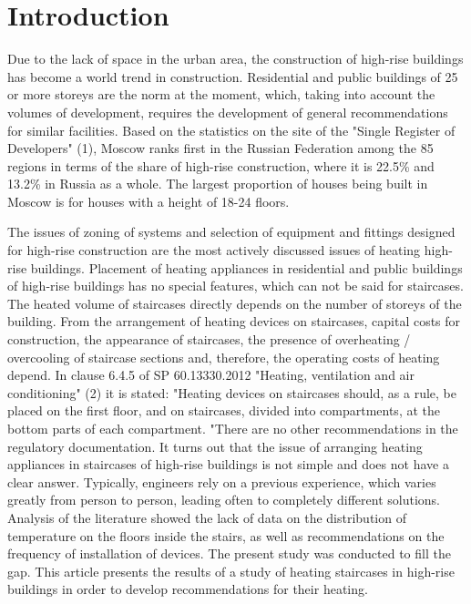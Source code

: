 \documentclass[preprint,12pt]{elsarticle}
\begin{document}


\section{Introduction}


Due to the lack of space in the urban area, the construction of high-rise buildings has become a world trend in construction. Residential and public buildings of 25 or more storeys are the norm at the moment, which, taking into account the volumes of development, requires the development of general recommendations for similar facilities. Based on the statistics on the site of the "Single Register of Developers" (1), Moscow ranks first in the Russian Federation among the 85 regions in terms of the share of high-rise construction, where it is 22.5\% and 13.2\% in Russia as a whole. The largest proportion of houses being built in Moscow is for houses with a height of 18-24 floors.

The issues of zoning of systems and selection of equipment and fittings designed for high-rise construction are the most actively discussed issues of heating high-rise buildings. Placement of heating appliances in residential and public buildings of high-rise buildings has no special features, which can not be said for staircases. The heated volume of staircases directly depends on the number of storeys of the building. From the arrangement of heating devices on staircases, capital costs for construction, the appearance of staircases, the presence of overheating / overcooling of staircase sections and, therefore, the operating costs of heating depend.
In clause 6.4.5 of SP 60.13330.2012 "Heating, ventilation and air conditioning" (2) it is stated: "Heating devices on staircases should, as a rule, be placed on the first floor, and on staircases, divided into compartments, at the bottom parts of each compartment. "There are no other recommendations in the regulatory documentation.
It turns out that the issue of arranging heating appliances in staircases of high-rise buildings is not simple and does not have a clear answer. Typically, engineers rely on a previous experience, which varies greatly from person to person, leading often to completely different solutions.
Analysis of the literature showed the lack of data on the distribution of temperature on the floors inside the stairs, as well as recommendations on the frequency of installation of devices. The present study was conducted to fill the gap. This article presents the results of a study of heating staircases in high-rise buildings in order to develop recommendations for their heating.
\end{document}
